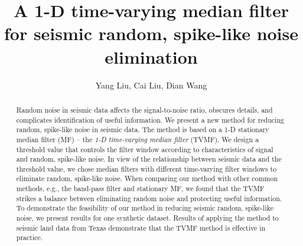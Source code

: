 
\title{A 1-D time-varying median filter for seismic random, spike-like noise elimination}

\renewcommand{\thefootnote}{\fnsymbol{footnote}}


\address{
\footnotemark[1] College of Geo-exploration Science and Technology,\\
Jilin University \\
No.6 Xi minzhu street, \\
Changchun, China, 130026 \\
\footnotemark[2] Bureau of Economic Geology,\\
John A. and Katherine G. Jackson School of Geosciences \\
The University of Texas at Austin \\
University Station, Box X \\
Austin, TX, USA, 78713-8924}

\author{Yang Liu\footnotemark[1]\footnotemark[2], Cai Liu\footnotemark[1], Dian Wang\footnotemark[1]}

\maketitle

\begin{abstract}

Random noise in seismic data affects the signal-to-noise ratio, 
obscures details, and complicates identification of useful information. We 
present a new method for reducing random, spike-like noise in seismic data. 
The method is based on a 1-D stationary median filter (MF) -- the \emph{1-D 
time-varying median filter} (TVMF). We design a threshold value that 
controls the filter window according to characteristics of signal and 
random, spike-like noise. In view of the relationship between seismic data 
and the threshold value, we chose median filters with different time-varying 
filter windows to eliminate random, spike-like noise. When comparing our 
method with other common methods, e.g., the band-pass filter 
and stationary MF, we found that 
the TVMF strikes a balance between eliminating random noise and protecting 
useful information. To demonstrate the feasibility of our method in reducing 
seismic random, spike-like noise, we present results for one synthetic dataset. 
Results of applying the method to seismic land data from Texas 
demonstrate that the TVMF method is effective in practice. 

\end{abstract}

